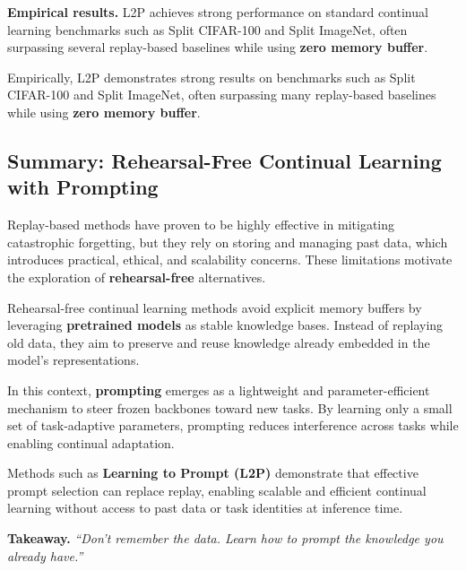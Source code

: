 \vspace{0.3cm}

\textbf{Empirical results.} L2P achieves strong performance on standard continual learning
benchmarks such as Split CIFAR-100 and Split ImageNet, often surpassing several replay-based
baselines while using \textbf{zero memory buffer}.


Empirically, L2P demonstrates strong results on benchmarks such as Split CIFAR-100 and
Split ImageNet, often surpassing many replay-based baselines while using \textbf{zero
memory buffer}.

\subsection{Summary: Rehearsal-Free Continual Learning with Prompting}

Replay-based methods have proven to be highly effective in mitigating catastrophic
forgetting, but they rely on storing and managing past data, which introduces practical,
ethical, and scalability concerns. These limitations motivate the exploration of
\textbf{rehearsal-free} alternatives.

Rehearsal-free continual learning methods avoid explicit memory buffers by leveraging
\textbf{pretrained models} as stable knowledge bases. Instead of replaying old data, they
aim to preserve and reuse knowledge already embedded in the model’s representations.

In this context, \textbf{prompting} emerges as a lightweight and parameter-efficient
mechanism to steer frozen backbones toward new tasks. By learning only a small set of
task-adaptive parameters, prompting reduces interference across tasks while enabling
continual adaptation.

Methods such as \textbf{Learning to Prompt (L2P)} demonstrate that effective prompt
selection can replace replay, enabling scalable and efficient continual learning without
access to past data or task identities at inference time.

\textbf{Takeaway.} \emph{“Don’t remember the data. Learn how to prompt the knowledge you
already have.”}
